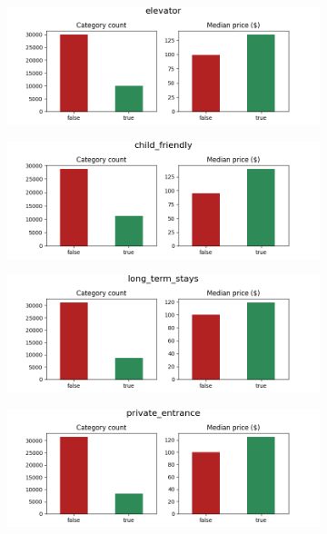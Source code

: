 \begin{figure}[H]
\begin{subfigure}[b]{0.3\textwidth}
        \includegraphics[width=\textwidth]{figures/amenities/group1/elevator.png}
    \end{subfigure}
    \hfill
    \begin{subfigure}[b]{0.3\textwidth}
        \centering
        \includegraphics[width=\textwidth]{figures/amenities/group1/child_friendly.png}
    \end{subfigure}
    \hfill
    \begin{subfigure}[b]{0.3\textwidth}
        \centering
        \includegraphics[width=\textwidth]{figures/amenities/group1/long_term_stays.png}
    \end{subfigure}
    \hfill
    \begin{subfigure}[b]{0.3\textwidth}
        \centering
        \includegraphics[width=\textwidth]{figures/amenities/group1/private_entrance.png}

\end{subfigure}
\end{figure}
